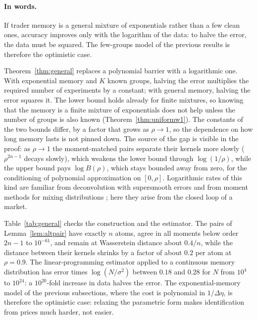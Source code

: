 \documentclass[12pt]{article}
\theoremstyle{definition}
\theoremstyle{remark}
\begin{document}
\paragraph{In words.} If trader memory is a general mixture of exponentials rather than a few clean ones, accuracy improves only with the logarithm of the data: to halve the error, the data must be squared. The few-groups model of the previous results is therefore the optimistic case.


Theorem~\ref{thm:general} replaces a polynomial barrier with a logarithmic one. With exponential memory and $K$ known groups, halving the error multiplies the required number of experiments by a constant; with general memory, halving the error squares it. The lower bound holds already for finite mixtures, so knowing that the memory is a finite mixture of exponentials does not help unless the number of groups is also known (Theorem~\ref{thm:uniformw1}). The constants of the two bounds differ, by a factor that grows as $\rho\to1$, so the dependence on how long memory lasts is not pinned down. The source of the gap is visible in the proof: as $\rho\to1$ the moment-matched pairs separate their kernels more slowly ($\rho^{2n-1}$ decays slowly), which weakens the lower bound through $\log(1/\rho)$, while the upper bound pays $\log B(\rho)$, which stays bounded away from zero, for the conditioning of polynomial approximation on $[0,\rho]$. Logarithmic rates of this kind are familiar from deconvolution with supersmooth errors \citep{fan1991} and from moment methods for mixing distributions \citep{kong2017,wu2020}; here they arise from the closed loop of a market.

Table~\ref{tab:general} checks the construction and the estimator. The pairs of Lemma~\ref{lem:altpair} have exactly $n$ atoms, agree in all moments below order $2n-1$ to $10^{-61}$, and remain at Wasserstein distance about $0.4/n$, while the distance between their kernels shrinks by a factor of about $0.2$ per atom at $\rho=0.9$. The linear-programming estimator applied to a continuous memory distribution has error times $\log(N/\sigma^2)$ between $0.18$ and $0.28$ for $N$ from $10^4$ to $10^{24}$: a $10^{20}$-fold increase in data halves the error. The exponential-memory model of the previous subsections, where the cost is polynomial in $1/\Delta\eta$, is therefore the optimistic case: relaxing the parametric form makes identification from prices much harder, not easier.
\end{document}
